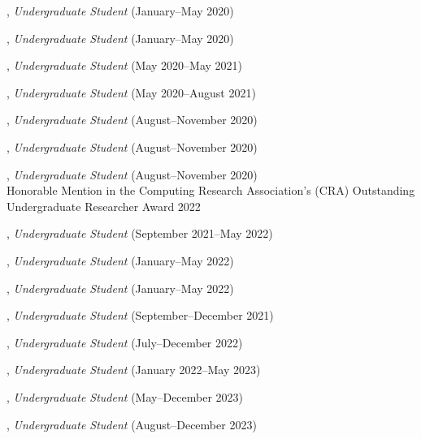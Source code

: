 \documentclass[10pt]{article}
\newenvironment{myindentpar}[1]%
{\begin{list}{}%
         {\setlength{\leftmargin}{#1}}%
         \item[]%
}
{\end{list}}
\newcounter{list}
\begin{document}
\begin{myindentpar}{0.75cm}
\hspace{-0.75cm}{\bf Alvin Alaphat}, \textit{Undergraduate Student} (January--May 2020)

\hspace{-0.75cm}{\bf Luke Marushack}, \textit{Undergraduate Student} (January--May 2020)

\hspace{-0.75cm}{\bf Michael Lee}, \textit{Undergraduate Student} (May 2020--May 2021)

\hspace{-0.75cm}{\bf Ms. Ann Hermann}, \textit{Undergraduate Student} (May 2020--August 2021)

\hspace{-0.75cm}{\bf Joseph Kuebler}, \textit{Undergraduate Student} (August--November 2020)

\hspace{-0.75cm}{\bf Facundo Munoz}, \textit{Undergraduate Student} (August--November 2020)

\hspace{-0.75cm}{\bf Fangcong Yin}, \textit{Undergraduate Student} (August--November 2020) \\
	Honorable Mention in the Computing Research Association's (CRA) Outstanding Undergraduate Researcher Award 2022

\hspace{-0.75cm}{\bf Jackson Ballow}, \textit{Undergraduate Student} (September 2021--May 2022)

\hspace{-0.75cm}{\bf Ryan Pairitz}, \textit{Undergraduate Student} (January--May 2022)

\hspace{-0.75cm}{\bf Kekoa Wang}, \textit{Undergraduate Student} (January--May 2022)

\hspace{-0.75cm}{\bf Ms. Longqing Chen}, \textit{Undergraduate Student} (September--December 2021)

\hspace{-0.75cm}{\bf William Porter}, \textit{Undergraduate Student} (July--December 2022)

\hspace{-0.75cm}{\bf Weike Fang}, \textit{Undergraduate Student} (January 2022--May 2023)

\hspace{-0.75cm}{\bf David Liu}, \textit{Undergraduate Student} (May--December 2023)

\hspace{-0.75cm}{\bf John Flanagan}, \textit{Undergraduate Student} (August--December 2023)


\end{myindentpar}
\end{document}

